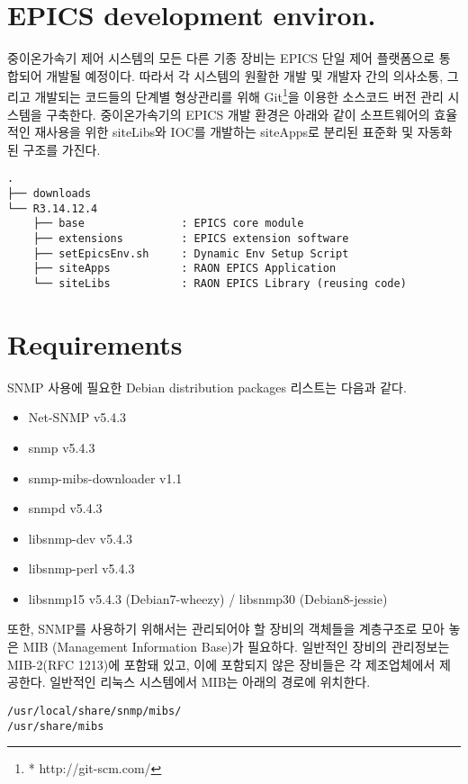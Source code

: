 \documentclass[11pt
  , a4paper
  , article
  , oneside
]{memoir}
\begin{document}
\section{EPICS development environ.}
중이온가속기 제어 시스템의 모든 다른 기종 장비는 EPICS 단일 제어 플랫폼으로 통합되어 개발될 예정이다. 따라서 각 시스템의 원활한 개발 및 개발자 간의 의사소통, 그리고 개발되는 코드들의 단계별 형상관리를 위해  Git\footnote{* http://git-scm.com/}을 이용한 소스코드 버전 관리 시스템을 구축한다. 중이온가속기의 EPICS 개발 환경은 아래와 같이 소프트웨어의 효율적인 재사용을 위한 siteLibs와 IOC를 개발하는 siteApps로 분리된 표준화 및 자동화된 구조를 가진다.

{\scriptsize
\begin{verbatim}
.
├── downloads              
└── R3.14.12.4             
    ├── base               : EPICS core module
    ├── extensions         : EPICS extension software
    ├── setEpicsEnv.sh     : Dynamic Env Setup Script
    ├── siteApps           : RAON EPICS Application
    └── siteLibs           : RAON EPICS Library (reusing code)
\end{verbatim}
}

\section{Requirements}

SNMP 사용에 필요한 Debian distribution packages 리스트는 다음과 같다. 

\begin{itemize}
\item Net-SNMP v5.4.3
\item snmp v5.4.3
\item snmp-mibs-downloader v1.1
\item snmpd v5.4.3
\item libsnmp-dev v5.4.3
\item libsnmp-perl v5.4.3
\item libsnmp15 v5.4.3 (Debian7-wheezy) / libsnmp30 (Debian8-jessie)
\end{itemize}

또한, SNMP를 사용하기 위해서는 관리되어야 할 장비의 객체들을 계층구조로 모아 놓은 MIB (Management Information Base)가 필요하다. 일반적인 장비의 관리정보는 MIB-2(RFC 1213)에 포함돼 있고, 이에 포함되지 않은 장비들은 각 제조업체에서 제공한다. 일반적인 리눅스 시스템에서 MIB는 아래의 경로에 위치한다.

{\scriptsize
\begin{verbatim}
/usr/local/share/snmp/mibs/ 
/usr/share/mibs
\end{verbatim}
}
\end{document}
